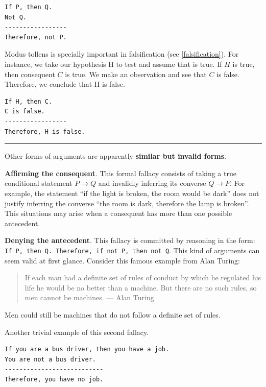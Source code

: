 \documentclass[
]{book}
\begin{document}
\begin{verbatim}
If P, then Q.
Not Q.
-----------------
Therefore, not P.
\end{verbatim}

Modus tollens is specially important in falsification (see \ref{falsification}). For instance, we take our hypothesis H to test and assume that is true. If \(H\) is true, then consequent \(C\) is true. We make an observation and see that \(C\) is false. Therefore, we conclude that H is false.

\begin{verbatim}
If H, then C.
C is false.
-----------------
Therefore, H is false.
\end{verbatim}

\begin{center}\rule{0.5\linewidth}{0.5pt}\end{center}

Other forms of arguments are apparently \textbf{similar but invalid forms}.

\textbf{Affirming the consequent}. This formal fallacy consists of taking a true conditional statement \(P \rightarrow Q\) and invalidly inferring its converse \(Q \rightarrow P\). For example, the statement ``if the light is broken, the room would be dark'' does not justify inferring the converse ``the room is dark, therefore the lamp is broken''. This situations may arise when a consequent has more than one possible antecedent.

\textbf{Denying the antecedent}. This fallacy is committed by reasoning in the form: \texttt{If\ P,\ then\ Q.\ Therefore,\ if\ not\ P,\ then\ not\ Q}. This kind of arguments can seem valid at first glance. Consider this famous example from Alan Turing:

\begin{quote}
If each man had a definite set of rules of conduct by which he regulated his life he would be no better than a machine. But there are no such rules, so men cannot be machines. --- Alan Turing
\end{quote}

Men could still be machines that do not follow a definite set of rules.

Another trivial example of this second fallacy.

\begin{verbatim}
If you are a bus driver, then you have a job.
You are not a bus driver.
---------------------------
Therefore, you have no job.
\end{verbatim}
\end{document}

